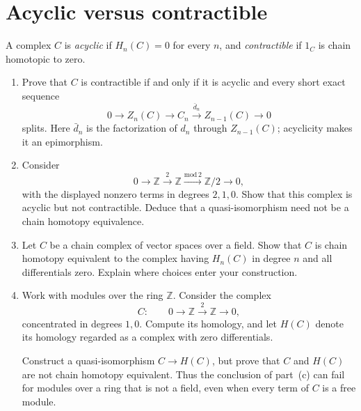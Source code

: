\documentclass[11pt]{article}
\newcommand{\Z}{\mathbb{Z}}
\begin{document}
\section{Acyclic versus contractible}
A complex \(C\) is \emph{acyclic} if \(H_n(C)=0\) for every \(n\), and
\emph{contractible} if \(1_C\) is chain homotopic to zero.
\begin{enumerate}
\item Prove that \(C\) is contractible if and only if it is acyclic and
every short exact sequence
\[
0\longrightarrow Z_n(C)\longrightarrow C_n
\xrightarrow{\bar{d}_n}Z_{n-1}(C)\longrightarrow0
\]
splits. Here \(\bar{d}_n\) is the factorization of \(d_n\) through
\(Z_{n-1}(C)\); acyclicity makes it an epimorphism.

\item Consider
\[
0\longrightarrow\Z\xrightarrow{\,2\,}\Z
\xrightarrow{\mathrm{mod}\,2}\Z/2\longrightarrow0,
\]
with the displayed nonzero terms in degrees \(2,1,0\). Show that this
complex is acyclic but not contractible. Deduce that a quasi-isomorphism
need not be a chain homotopy equivalence.

\item Let \(C\) be a chain complex of vector spaces over a field. Show
that \(C\) is chain homotopy equivalent to the complex having \(H_n(C)\)
in degree \(n\) and all differentials zero. Explain where choices enter
your construction.

\item Work with modules over the ring \(\Z\). Consider the complex
\[
C:\qquad 0\longrightarrow\Z\xrightarrow{\,2\,}\Z\longrightarrow0,
\]
concentrated in degrees \(1,0\). Compute its homology, and let \(H(C)\)
denote its homology regarded as a complex with zero differentials.

Construct a quasi-isomorphism \(C\to H(C)\), but prove that \(C\) and
\(H(C)\) are not chain homotopy equivalent. Thus the conclusion of
part~(c) can fail for modules over a ring that is not a field, even when
every term of \(C\) is a free module.
\end{enumerate}
\end{document}
